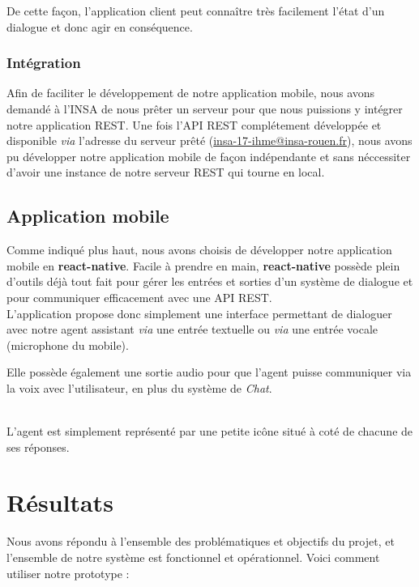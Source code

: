 De cette façon, l'application client peut connaître très facilement l'état d'un dialogue et donc agir en conséquence.\\

\subsubsection{Intégration}

Afin de faciliter le développement de notre application mobile, nous avons demandé à l'INSA de nous prêter un serveur pour que nous puissions y intégrer notre
application REST. Une fois l'API REST complétement développée et disponible \emph{via} l'adresse du serveur prêté (\url{insa-17-ihme@insa-rouen.fr}), nous avons pu développer
notre application mobile de façon indépendante et sans néccessiter d'avoir une instance de notre serveur REST qui tourne en local.

\subsection{Application mobile}

Comme indiqué plus haut, nous avons choisis de développer notre application mobile en \textbf{react-native}. Facile à prendre en main, \textbf{react-native} possède
plein d'outils déjà tout fait pour gérer les entrées et sorties d'un système de dialogue et pour communiquer efficacement avec une API REST.\\

L'application propose donc simplement une interface permettant de dialoguer avec notre agent assistant \emph{via} une entrée textuelle ou \emph{via} une entrée vocale (microphone du mobile).

Elle possède également une sortie audio pour que l'agent puisse communiquer via la voix avec l'utilisateur, en plus du système de \emph{Chat}.

~\\\indent
L'agent est simplement représenté par une petite icône situé à coté de chacune de ses réponses.

\section{Résultats}

Nous avons répondu à l'ensemble des problématiques et objectifs du projet, et l'ensemble de notre système est fonctionnel et opérationnel. Voici comment utiliser notre prototype : \\

